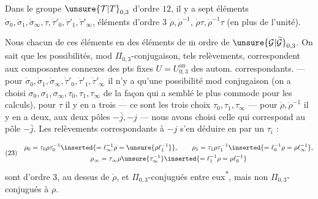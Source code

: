 Dans le groupe $\unsure{\mathcal T|T}_{0,3}$ d'ordre $12$, il y a sept éléments 
$\dot\sigma_0,\dot\sigma_1,\dot\sigma_\infty,\tau,\dot\tau'_0,\dot\tau'_1,\dot\tau'_\infty$,
  éléments d'ordre $3$
$\dot\rho,\dot\rho^{-1}$, 
$\dot\rho\tau,\dot\rho^{-1}\tau$ (en plus de l'unité).

Nous   chacun de ces éléments en des éléments de $\overline{\mathrm m}$ ordre de
$\unsure{\mathcal G|\widetilde{\mathcal G}}_{0,3}$.
On sait que les possibilités, mod $\Pi_{0,3}$-conjugaison,  tels relèvements,
correspondent aux composantes connexes des pts fixes  $U=U_{0,3}^{\mathrm{an}}$
des autom.  correspondants. --- pour
$\dot\sigma_0,\dot\sigma_1,\dot\sigma_\infty,\dot\tau'_0,\dot\tau'_1,\dot\tau'_\infty$
il n'y a qu'une possibilité mod conjugaison (on a choisi
$\sigma_0,\sigma_1,\sigma_\infty,\tau_0,\tau_1,\tau_\infty$
de la façon qui a semblé le plus commode pour les calculs),
pour $\tau$ il y en a trois --- ce sont les trois choix $\tau_0,\tau_1,\tau_\infty$
--- pour $\dot\rho,\dot\rho^{-1}$ il y en a deux,
 aux deux pôles $-\bar j,-j$ --- nous avons choisi celle qui
correspond au pôle $-\bar j$.
Les relèvements correspondants à $-j$  s'en déduire en  par un $\tau_i$ :



\[
(23)\quad
\begin{gathered}
\rho_0=\tau_0\rho\tau_0^{-1}
\inserted{=\ell_\infty^{-1}\rho=\unsure{\rho \ell_1^{-1}}},\qquad
\rho_1=\tau_1\rho\tau_1^{-1}
\inserted{=\ell_0^{-1}\rho=\rho \ell_\infty^{-1}},\\
\rho_\infty=\tau_\infty\rho\unsure{\tau_\infty^{-1}}
\inserted{=\ell_1^{-1}\rho=\rho \ell_0^{-1}}
\end{gathered}
\]
sont d'ordre 3, au dessus de $\dot\rho$, et $\Pi_{0,3}$-conjugués entre eux\textsuperscript{*}, mais non $\Pi_{0,3}$-conjugués à $\rho$.


